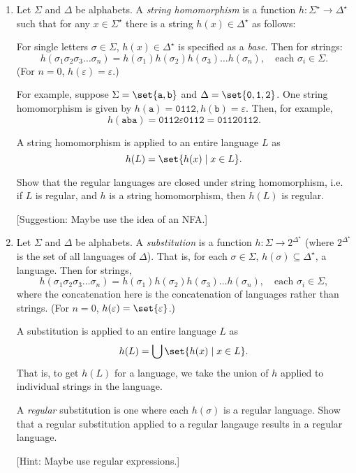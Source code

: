 \documentclass{cs81-homework}
\begin{document}
\begin{enumerate}
  \begin{solution}
  \end{solution}

\item {} Let \(\Sigma\) and \(\Delta\) be alphabets.  A \emph{string
    homomorphism} is a function \(h \colon \Sigma^\star \to \Delta^\star\) such
  that for any \(x \in \Sigma^\star\) there is a string
  \(h(x) \in \Delta^\star\) as follows:

  For single letters \(\sigma \in \Sigma\), \(h(x) \in \Delta^\star\) is
  specified as a \emph{base}.  Then for strings:
  \[
    h(\sigma_1 \sigma_2 \sigma_3 \dots \sigma_n) = h(\sigma_1) h(\sigma_2)
    h(\sigma_3) \dots h(\sigma_n), \quad \text{each \(\sigma_i \in \Sigma\)}.
  \]
  (For \(n = 0\), \(h(\varepsilon) = \varepsilon\).)

  For example, suppose \(\Sigma = \set{\mathtt a, \mathtt b}\) and
  \(\Delta = \set{\mathtt 0, \mathtt 1, \mathtt 2}\).  One string homomorphism
  is given by \(h(\mathtt a) = \mathtt{0112}, h(\mathtt b) = \varepsilon\).
  Then, for example,
  \[
    h(\mathtt{aba}) = \mathtt{0112}\varepsilon\mathtt{0112} = \mathtt{01120112}.
  \]

  A string homomorphism is applied to an entire language \(L\) as
  \[
    h(L) = \set{h(x) \mid x \in L}.
  \]

  Show that the regular languages are closed under string homomorphism, i.e. if
  \(L\) is regular, and \(h\) is a string homomorphism, then \(h(L)\) is
  regular.

  [Suggestion: Maybe use the idea of an NFA.]

  \begin{solution}
  \end{solution}

\item {} Let \(\Sigma\) and \(\Delta\) be alphabets.  A
  \emph{substitution} is a function \(h \colon \Sigma \to 2^{\Delta^\star}\)
  (where \(2^{\Delta^\star}\) is the set of all languages of \(\Delta\)).  That
  is, for each \(\sigma \in \Sigma\), \(h(\sigma) \subseteq \Delta^\star\), a
  language.  Then for strings,
  \[
    h(\sigma_1 \sigma_2 \sigma_3 \dots \sigma_n) = h(\sigma_1) h(\sigma_2)
    h(\sigma_3) \dots h(\sigma_n), \quad \text{each \(\sigma_i \in \Sigma\)},
  \]
  where the concatenation here is the concatenation of languages rather than
  strings.  (For \(n = 0\), \(h(\varepsilon) = \set{\varepsilon}\).)

  A substitution is applied to an entire language \(L\) as
  \[
    h(L) = \bigcup \set{h(x) \mid x \in L}.
  \]
  That is, to get \(h(L)\) for a language, we take the union of \(h\) applied to
  individual strings in the language.

  A \emph{regular} substitution is one where each \(h(\sigma)\) is a regular
  language.  Show that a regular substitution applied to a regular langauge
  results in a regular language.

  [Hint: Maybe use regular expressions.]
  
  \begin{solution}
  \end{solution}
  
\end{enumerate}
\end{document}
